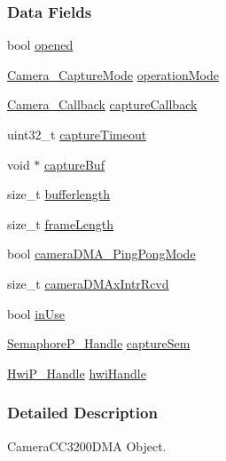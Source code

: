 \subsubsection*{Data Fields}
\begin{DoxyCompactItemize}
\item 
bool \hyperlink{struct_camera_c_c3200_d_m_a___object_a2e99e02c8def5c2896e44b15a2f4f64f}{opened}
\item 
\hyperlink{_camera_8h_a74c8a8a13eebddea16c33c726d096ba8}{Camera\+\_\+\+Capture\+Mode} \hyperlink{struct_camera_c_c3200_d_m_a___object_aaa0838ac44e51d70def41781c7729532}{operation\+Mode}
\item 
\hyperlink{_camera_8h_ad70b3ced1706386d1a093a0bf659bd87}{Camera\+\_\+\+Callback} \hyperlink{struct_camera_c_c3200_d_m_a___object_a1c312487767a09f76b15980edd37376c}{capture\+Callback}
\item 
uint32\+\_\+t \hyperlink{struct_camera_c_c3200_d_m_a___object_a3b5a430c0b49ac9892048855e27d83bf}{capture\+Timeout}
\item 
void $\ast$ \hyperlink{struct_camera_c_c3200_d_m_a___object_a56ea7a063ed0e8cf8afa0afd6f038755}{capture\+Buf}
\item 
size\+\_\+t \hyperlink{struct_camera_c_c3200_d_m_a___object_ae41c48404a17a22275174828a0e9c716}{bufferlength}
\item 
size\+\_\+t \hyperlink{struct_camera_c_c3200_d_m_a___object_ad39831496e4b0d2524a3330eb61e03d9}{frame\+Length}
\item 
bool \hyperlink{struct_camera_c_c3200_d_m_a___object_a4689867d47ffb91755cb1ee8d5c398bb}{camera\+D\+M\+A\+\_\+\+Ping\+Pong\+Mode}
\item 
size\+\_\+t \hyperlink{struct_camera_c_c3200_d_m_a___object_a02df95c2e304c158c4b0546514fd0197}{camera\+D\+M\+Ax\+Intr\+Rcvd}
\item 
bool \hyperlink{struct_camera_c_c3200_d_m_a___object_a6f3345ee783c717458d5d6023b317507}{in\+Use}
\item 
\hyperlink{_semaphore_p_8h_a7f34865f33e666455692544e5f12d1f2}{Semaphore\+P\+\_\+\+Handle} \hyperlink{struct_camera_c_c3200_d_m_a___object_a88fd58c7a1d952724eac0378636955a7}{capture\+Sem}
\item 
\hyperlink{_hwi_p_8h_a7dd325ff62af296374efc6d317f5e368}{Hwi\+P\+\_\+\+Handle} \hyperlink{struct_camera_c_c3200_d_m_a___object_a1fa67c202c12cf460cfc3006024365cb}{hwi\+Handle}
\end{DoxyCompactItemize}


\subsubsection{Detailed Description}
Camera\+C\+C3200\+D\+M\+A Object. 

